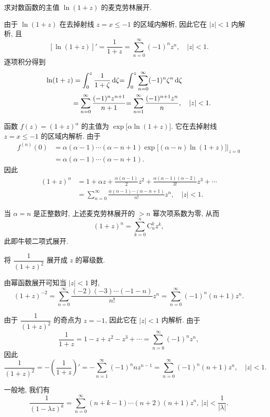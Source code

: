 \documentclass[nocolor,theme=doremi,lang=cn,11pt,chinese,twoside,openright,usesamecnt]{elegantbook}
\newenvironment{proofblock}[1]{\begin{tcolorbox}[prooftyle,title=#1,fontupper=\itshape]}{\end{tcolorbox}}
\begin{document}
\begin{example}
求对数函数的主值 $\ln(1+z)$ 的麦克劳林展开.
\end{example}
\begin{solution}
由于 $\ln(1+z)$ 在去掉射线 $z=x\le-1$ 的区域内解析,
{因此它在 $|z|<1$ 内解析,
}{且
	\[[\ln(1+z)]'=\frac1{1+z}=\sum_{n=0}^\infty(-1)^nz^n,\quad|z|<1.\]
}{逐项积分得到
\begin{align*}
\ln(1+z)&=\int_0^z\frac1{1+\zeta}\,\mathrm{d}\zeta
	{=\int_0^z\sum_{n=0}^\infty(-1)^n\zeta^n\,\mathrm{d}\zeta}\\
&{=\sum_{n=0}^\infty\frac{(-1)^nz^{n+1}}{n+1}}
	{=\sum_{n=1}^\infty\frac{(-1)^{n+1}z^n}{n},\quad|z|<1.}
\end{align*}}
\end{solution}

\begin{example}
	函数 $f(z)=(1+z)^\alpha$ 的主值为 $\exp\bigl[\alpha\ln(1+z)\bigr]$. 它在去掉射线 $z=x\le -1$ 的区域内解析. 由于
	\begin{align*}
		f^{(n)}(0)&=\alpha(\alpha-1)\cdots(\alpha-n+1)\exp\bigl[(\alpha-n)\ln(1+z)\bigr]\Big|_{z=0}\\
		&=\alpha(\alpha-1)\cdots(\alpha-n+1).
	\end{align*}
	因此
	\begin{align*}
		(1+z)^\alpha&=1+\alpha z+\frac{\alpha(\alpha-1)}2z^2+\frac{\alpha(\alpha-1)(\alpha-2)}{3!}z^3+\cdots\\
		&=\sum_{n=0}^\infty\frac{\alpha(\alpha-1)\cdots(\alpha-n+1)}{n!}z^n,\quad |z|<1.
	\end{align*}
\end{example}

当 $\alpha=n$ 是正整数时, 上述麦克劳林展开的 $>n$ 幂次项系数为零, 
从而
	\[(1+z)^n=\sum_{k=0}^n \mathrm{C}_n^k z^k,\]
此即牛顿二项式展开.

\begin{example}
	将 $\dfrac1{(1+z)^2}$ 展开成 $z$ 的幂级数.
\end{example}

\begin{solution}
	由幂函数展开可知当 $|z|<1$ 时,
	\[(1+z)^{-2}=\sum_{n=0}^\infty \frac{(-2)(-3)\cdots(-1-n)}{n!}z^n
	{=\sum_{n=0}^\infty (-1)^n(n+1)z^n.}\]
\end{solution}

\begin{proofblock}{另解}
	由于 $\dfrac1{(1+z)^2}$ 的奇点为 $z=-1$, 因此它在 $|z|<1$ 内解析.
	{由于
		\[\frac1{1+z}=1-z+z^2-z^3+\cdots=\sum_{n=0}^\infty (-1)^nz^n,\]因此
		\[
		\frac1{(1+z)^2}=-\left(\frac1{1+z}\right)'
		{=-\sum_{n=1}^\infty(-1)^n nz^{n-1}}
		{=\sum_{n=0}^\infty(-1)^n (n+1)z^n,\quad |z|<1.}
		\]
	}
\end{proofblock}
一般地, 我们有
\[\frac1{(1-\lambda z)^k}=\sum_{n=0}^\infty(n+k-1)\cdots(n+2)(n+1)z^n,\ |z|<\frac1{|\lambda|}.\]
\end{document}
